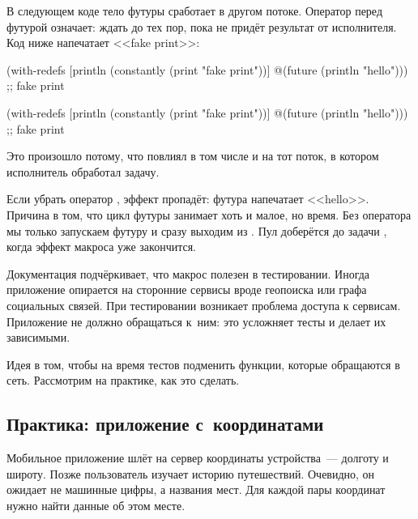 В следующем коде тело футуры  сработает в другом
потоке. Оператор  перед футурой означает: ждать до тех пор, пока не
придёт результат от исполнителя. Код ниже напечатает <<fake print>>:


\ifnarrow

\begin{clojure}
(with-redefs
  [println (constantly
             (print "fake print"))]
  @(future (println "hello")))
;; fake print
\end{clojure}

\else

\begin{clojure}
(with-redefs
  [println (constantly (print "fake print\n"))]
  @(future (println "hello")))
;; fake print
\end{clojure}

\fi

Это произошло потому, что  повлиял в том числе и на тот
поток, в котором исполнитель обработал задачу.

Если убрать оператор , эффект  пропадёт: футура
напечатает <<hello>>. Причина в том, что цикл футуры занимает хоть и малое, но
время. Без оператора  мы только запускаем футуру и сразу выходим из
. Пул доберётся до задачи , когда
эффект макроса уже закончится.

Документация  подчёркивает, что макрос полезен в
тестировании. Иногда приложение опирается на сторонние сервисы вроде геопоиска
или графа социальных связей. При тестировании возникает проблема доступа к
сервисам. Приложение не должно обращаться к~ним: это усложняет тесты и делает их
зависимыми.

Идея в том, чтобы на время тестов подменить функции, которые обращаются в
сеть. Рассмотрим на практике, как это сделать.

\subsection{Практика: приложение с~координатами}


Мобильное приложение шлёт на сервер координаты устройства~--- долготу и
широту. Позже пользователь изучает историю путешествий. Очевидно, он ожидает не
машинные цифры, а названия мест. Для каждой пары координат нужно найти данные об
этом месте.

